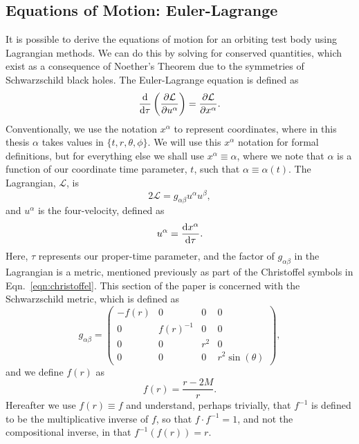 \subsection{Equations of Motion: Euler-Lagrange}
It is possible to derive the equations of motion for an orbiting test body using Lagrangian methods.
We can do this by solving for conserved quantities, which exist as a consequence of Noether's Theorem due to the symmetries of Schwarzschild black holes.
The Euler-Lagrange equation is defined as \cite{eulerLagrange}
\begin{equation}
\dv{\tau} \left(\frac{\partial \mathcal{L}}{\partial u^\alpha} \right)=\frac{\partial \mathcal{L}}{\partial x^\alpha}.
\end{equation}
Conventionally, we use the notation $x^\alpha$ to represent coordinates, where in this thesis $\alpha$ takes values in $\{t,r,\theta,\phi\}$.
We will use this $x^\alpha$ notation for formal definitions, but for everything else we shall use $x^\alpha\equiv\alpha$, where we note that $\alpha$ is a function of our coordinate time parameter, $t$, such that $\alpha\equiv\alpha(t)$.
The Lagrangian, $\mathcal{L}$, is \cite{chandraBook}
\begin{equation}\label{eqn:stdlagrangian}
2\mathcal{L}=g_{\alpha\beta}u^\alpha u^\beta,
\end{equation}
and $u^\alpha$ is the four-velocity, defined as
\begin{equation}
u^\alpha = \dv{x^\alpha}{\tau}.
\end{equation}
Here, $\tau$ represents our proper-time parameter, and the factor of $g_{\alpha\beta}$ in the Lagrangian is a metric, mentioned previously as part of the Christoffel symbols in Eqn.~\eqref{eqn:christoffel}.
This section of the paper is concerned with the Schwarzschild metric, which is defined as \cite{schwarz1916}
\begin{equation}\label{eqn:schwarzMet}
g_{\alpha\beta}=
\begin{pmatrix}
    -f(r) & 0 & 0 & 0\\
    0 & f(r)^{-1} & 0 & 0\\
    0 & 0 & r^2 & 0\\
    0 & 0 & 0 & r^2\sin(\theta)
\end{pmatrix},
\end{equation}
and we define $f(r)$ as
\begin{equation}
f(r)=\frac{r-2M}{r}.
\end{equation}
Hereafter we use $f(r)\equiv f$ and understand, perhaps trivially, that $f^{-1}$ is defined to be the multiplicative inverse of $f$, so that $f\cdot f^{-1}=1$, and not the compositional inverse, in that $f^{-1}(f(r))=r$.
